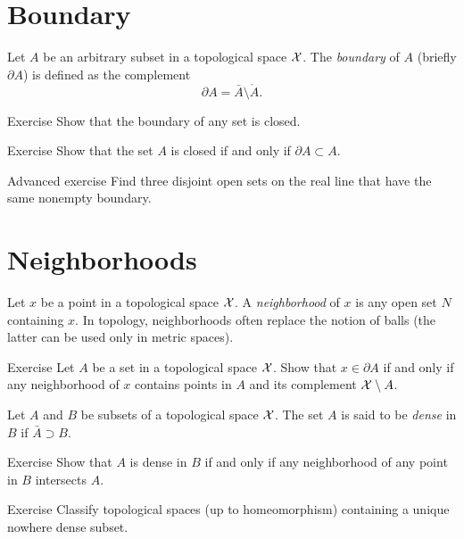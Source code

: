 \section{Boundary}

Let $A$ be an arbitrary subset in a topological space $\mathcal{X}$.
The \emph{boundary} of $A$ (briefly $\partial A$) is defined as the complement 
\[\partial A=\bar A\setminus \mathring A.\]

\begin{thm}{Exercise}\label{ex:bry-closed}
Show that the boundary of any set is closed.
\end{thm}

\begin{thm}{Exercise}\label{ex:bry<closure}
Show that the set $A$ is closed if and only if $\partial A\subset A$.
\end{thm}

\begin{thm}{Advanced exercise}\label{ex:3=bry}
Find three disjoint open sets on the real line 
that have the same nonempty boundary.
\end{thm}

\section{Neighborhoods}

Let $x$ be a point in a topological space $\mathcal{X}$.
A \emph{neighborhood} of $x$ is any open set $N$ containing $x$.
In topology, neighborhoods often replace the notion of balls (the latter can be used only in metric spaces).  

\begin{thm}{Exercise}\label{ex:bry-nbhd}
Let $A$ be a set in a topological space $\mathcal{X}$.
Show that $x\in \partial A$ if and only if any neighborhood of $x$ contains points in $A$ and its complement $\mathcal{X}\setminus A$. 
\end{thm}

Let $A$ and $B$ be subsets of a topological space $\mathcal{X}$.
The set $A$ is said to be \emph{dense} in $B$ if $\bar A\supset B$.

\begin{thm}{Exercise}\label{ex:dense-nbhd} 
Show that $A$ is dense in $B$ if and only if any neighborhood of any point in $B$ intersects $A$.
\end{thm}

\begin{thm}{Exercise}\label{ex:nowhere-dense}
Classify topological spaces (up to homeomorphism) containing a unique nowhere
dense subset.
\end{thm}


